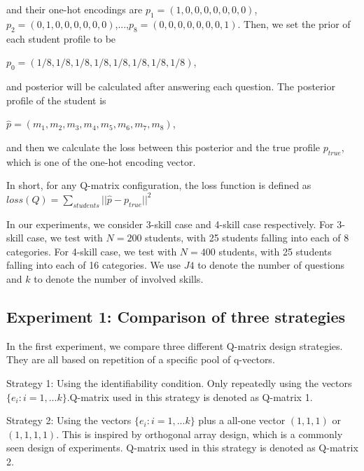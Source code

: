 \documentclass{edm_template}
\begin{document}
and their one-hot encodings are 
$p_1=(1,0,0,0,0,0,0,0)$, $p_2=(0,1,0,0,0,0,0,0)$,...,$p_8=(0,0,0,0,0,0,0,1)$.
Then, we set the prior of each student profile to be 

$p_0=(1/8,1/8,1/8,1/8,1/8,1/8,1/8,1/8)$, 

and posterior will be calculated after answering each question. The posterior profile of the student is 

$\hat{p} = (m_1,m_2,m_3,m_4,m_5,m_6,m_7,m_8)$, 

and then we calculate the loss between this posterior and the true profile $p_{true}$, which is one of the one-hot encoding vector. 

In short, for any Q-matrix configuration, the loss function is defined as
$ loss(Q) = \sum_{students} ||\hat{p} - p_{true}||^2$

In our experiments, we consider 3-skill case and 4-skill case respectively. For 3-skill case, we test with $N=200$ students, with 25 students falling into each of 8 categories. For 4-skill case, we test with $N=400$ students, with 25 students falling into each of 16 categories. We use $J4$ to denote the number of questions and $k$ to denote the number of involved skills.
\subsection{Experiment 1: Comparison of three strategies}
In the first experiment, we compare three different Q-matrix design strategies. They are all based on repetition of a specific pool of q-vectors.

Strategy 1: Using the identifiability condition. Only repeatedly using the vectors $\{e_{i}:i=1,...k\}$.Q-matrix used in this strategy is denoted as Q-matrix 1.

Strategy 2: Using the vectors $\{e_{i}:i=1,...k\}$ plus a all-one vector $(1,1,1)$ or $(1,1,1,1)$. This is inspired by orthogonal array design, which is a commonly seen design of experiments\cite{montgomery2017design}. Q-matrix used in this strategy is denoted as Q-matrix 2.
\end{document}
